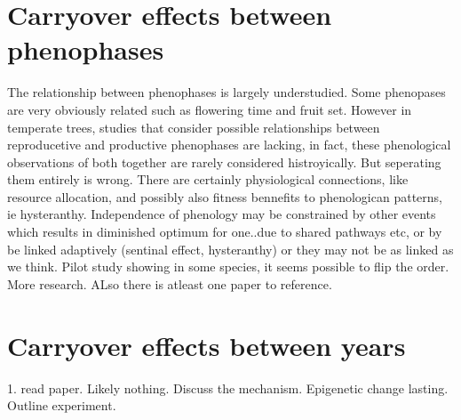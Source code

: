 \documentclass{article}\usepackage[]{graphicx}\usepackage[]{color}
\begin{document}
\section{Carryover effects between phenophases}
The relationship between phenophases is largely understudied. Some phenopases are very obviously related such as flowering time and fruit set. However in temperate trees, studies that consider possible relationships between reproducetive and productive phenophases are lacking, in fact, these phenological observations of both together are rarely considered histroyically. But seperating them entirely is wrong. There are certainly physiological connections, like resource allocation, and possibly also fitness bennefits to phenologican patterns, ie hysteranthy. Independence of phenology may be constrained by other events which results in diminished optimum for one..due to shared pathways etc, or by be linked adaptively (sentinal effect, hysteranthy) or they may not be as linked as we think. Pilot study showing in some species, it seems possible to flip the order. More research. ALso there is atleast one paper to reference.
\section{Carryover effects between years}
1. read paper. Likely nothing. Discuss the mechanism. Epigenetic change lasting. Outline experiment.
\end{document}
